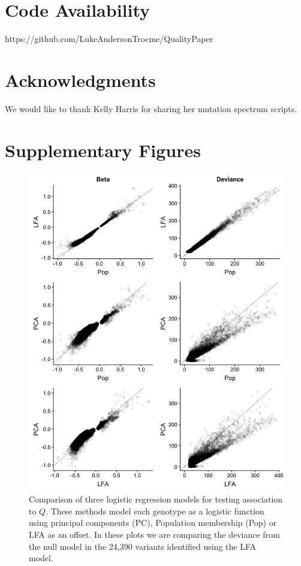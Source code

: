 \documentclass[9pt,lineno]{elife}
\begin{document}
\section{Code Availability}
https://github.com/LukeAndersonTrocme/QualityPaper

\section{Acknowledgments}
We would like to thank Kelly Harris for sharing her mutation spectrum scripts.



\clearpage
\section{Supplementary Figures}

\begin{figure}[h]
\centering
\includegraphics[width=15cm,keepaspectratio]{./Figures/fits_Significant_Positions_CompareModels.jpg}
\caption{Comparison of three logistic regression models for testing association to $Q$.
These methods model each genotype as a logistic function using principal components (PC), Population membership (Pop) or LFA as an offset.
In these plots we are comparing the deviance from the null model in the 24,390 variants identified using the LFA model.}  
\label{CompareModel}
\end{figure}
\end{document}
